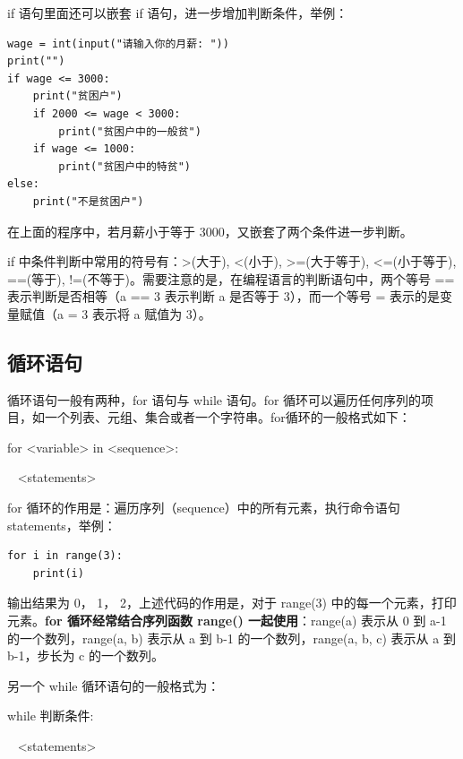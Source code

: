 if 语句里面还可以嵌套 if 语句，进一步增加判断条件，举例：

\begin{lstlisting}[Language=Python]
wage = int(input("请输入你的月薪: "))
print("")
if wage <= 3000:
    print("贫困户")
    if 2000 <= wage < 3000:
        print("贫困户中的一般贫")
    if wage <= 1000:
        print("贫困户中的特贫")
else:
    print("不是贫困户")
\end{lstlisting}

在上面的程序中，若月薪小于等于 3000，又嵌套了两个条件进一步判断。

if 中条件判断中常用的符号有：>(大于), <(小于), >=(大于等于), <=(小于等于), ==(等于), !=(不等于)。需要注意的是，在编程语言的判断语句中，两个等号 == 表示判断是否相等（a == 3 表示判断 a 是否等于 3），而一个等号 = 表示的是变量赋值（a = 3 表示将 a 赋值为 3）。

\subsection{循环语句}

循环语句一般有两种，for 语句与 while 语句。for 循环可以遍历任何序列的项目，如一个列表、元组、集合或者一个字符串。for循环的一般格式如下：

\begin{center}
\begin{tcolorbox} [title = for 循环的一般格式]
  \bf
  \begin{tcboutputlisting}
    for <variable> in <sequence>:

    \quad~ <statements>
\end{tcboutputlisting}
\end{tcolorbox}
\end{center}

for 循环的作用是：遍历序列（sequence）中的所有元素，执行命令语句 statements，举例：

\begin{lstlisting}[Language=Python]
for i in range(3):
    print(i)
\end{lstlisting}

输出结果为 0， 1， 2，上述代码的作用是，对于 range(3) 中的每一个元素，打印元素。\textbf{for 循环经常结合序列函数 range() 一起使用}：range(a) 表示从 0 到 a-1 的一个数列，range(a, b) 表示从 a 到 b-1 的一个数列，range(a, b, c) 表示从 a 到 b-1，步长为 c 的一个数列。

另一个 while 循环语句的一般格式为：
\begin{center}
\begin{tcolorbox} [title = while 循环的一般格式]
  \bf
  \begin{tcboutputlisting}
    while 判断条件:

    \quad~ <statements>
\end{tcboutputlisting}
\end{tcolorbox}
\end{center}

